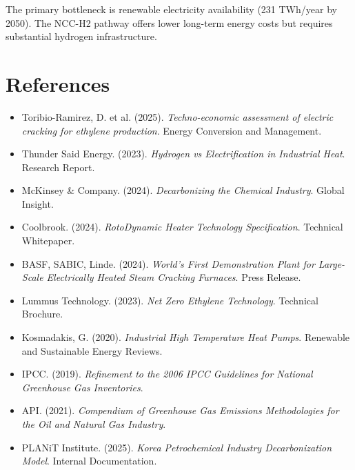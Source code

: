 \documentclass[12pt,a4paper]{article}
\begin{document}
The primary bottleneck is renewable electricity availability (231 TWh/year by 2050). The NCC-H2 pathway offers lower long-term energy costs but requires substantial hydrogen infrastructure.

\section{References}

\begin{itemize}
    \item Toribio-Ramirez, D. et al. (2025). \textit{Techno-economic assessment of electric cracking for ethylene production}. Energy Conversion and Management.
    \item Thunder Said Energy. (2023). \textit{Hydrogen vs Electrification in Industrial Heat}. Research Report.
    \item McKinsey \& Company. (2024). \textit{Decarbonizing the Chemical Industry}. Global Insight.
    \item Coolbrook. (2024). \textit{RotoDynamic Heater Technology Specification}. Technical Whitepaper.
    \item BASF, SABIC, Linde. (2024). \textit{World's First Demonstration Plant for Large-Scale Electrically Heated Steam Cracking Furnaces}. Press Release.
    \item Lummus Technology. (2023). \textit{Net Zero Ethylene Technology}. Technical Brochure.
    \item Kosmadakis, G. (2020). \textit{Industrial High Temperature Heat Pumps}. Renewable and Sustainable Energy Reviews.
    \item IPCC. (2019). \textit{Refinement to the 2006 IPCC Guidelines for National Greenhouse Gas Inventories}.
    \item API. (2021). \textit{Compendium of Greenhouse Gas Emissions Methodologies for the Oil and Natural Gas Industry}.
    \item PLANiT Institute. (2025). \textit{Korea Petrochemical Industry Decarbonization Model}. Internal Documentation.
\end{itemize}
\end{document}
